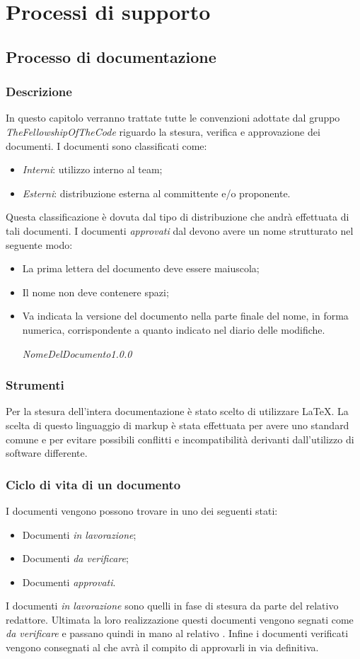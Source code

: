 \section{Processi di supporto}
\subsection{Processo di documentazione}
\subsubsection{Descrizione}
In questo capitolo verranno trattate tutte le convenzioni adottate dal gruppo 
\textsl{TheFellowshipOfTheCode} riguardo la stesura, verifica e approvazione dei 
documenti.
I documenti sono classificati come:
\begin{itemize}
  \item \textsl{Interni}: utilizzo interno al team;
  \item \textsl{Esterni}: distribuzione esterna al committente e/o proponente.
\end{itemize}
Questa classificazione è dovuta dal tipo di distribuzione che andrà effettuata di tali documenti.
I documenti \textsl{approvati} dal \textsl{\RdP} devono avere un nome strutturato nel seguente modo:
\begin{itemize}
  \item La prima lettera del documento deve essere maiuscola;
  \item Il nome non deve contenere spazi;
  \item Va indicata la versione del documento nella parte finale del nome, in forma numerica, 
  corrispondente a quanto indicato nel diario delle modifiche. 
  \begin{center}
  \textsl{NomeDelDocumento1.0.0}
  \end{center}
\end{itemize}
\subsubsection{Strumenti}
Per la stesura dell'intera documentazione è stato scelto di utilizzare \LaTeX. 
La scelta di questo linguaggio di markup è stata effettuata per avere uno 
standard comune e per evitare possibili conflitti e incompatibilità derivanti 
dall'utilizzo di software differente.
\subsubsection{Ciclo di vita di un documento}
 I documenti vengono possono trovare in uno dei seguenti stati:
\begin{itemize}
  \item Documenti \textsl{in lavorazione};
  \item Documenti \textsl{da verificare};
  \item Documenti \textsl{approvati}.
\end{itemize}
I documenti \textsl{in lavorazione} sono quelli in fase di stesura da parte del 
relativo redattore. Ultimata la loro realizzazione questi documenti vengono 
segnati come \textsl{da verificare} e passano quindi in mano al relativo 
\textsl{\Ver}. Infine i documenti verificati vengono consegnati al \textsl{\RdP} 
che avrà il compito di approvarli in via definitiva.
